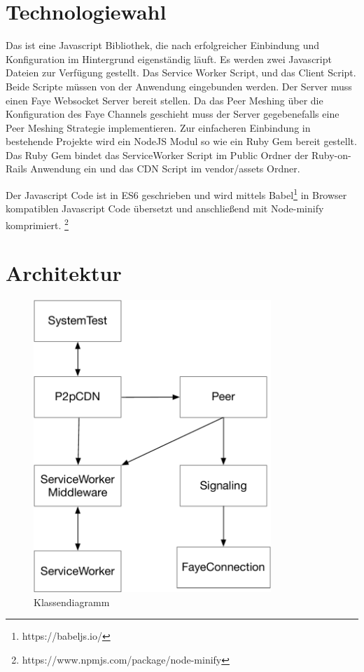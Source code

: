 %

\section{Technologiewahl}
Das \pTp \cdn ist eine Javascript Bibliothek, die nach erfolgreicher Einbindung und Konfiguration im Hintergrund eigenständig läuft. Es werden zwei Javascript Dateien zur Verfügung gestellt. Das Service Worker Script, und das \pTp \cdn Client Script. Beide Scripte müssen von der Anwendung eingebunden werden. Der Server muss einen Faye Websocket Server bereit stellen. Da das Peer Meshing über die Konfiguration des Faye Channels geschieht muss der Server gegebenefalls eine Peer Meshing Strategie implementieren. Zur einfacheren Einbindung in bestehende Projekte wird ein NodeJS Modul so wie ein Ruby Gem bereit gestellt. Das Ruby Gem bindet das ServiceWorker Script im Public Ordner der Ruby-on-Rails Anwendung ein und das \pTp CDN Script im vendor/assets Ordner.

Der Javascript Code ist in ES6 geschrieben und wird mittels Babel\footnote{https://babeljs.io/} in Browser kompatiblen Javascript Code übersetzt und anschließend mit Node-minify komprimiert. \footnote{https://www.npmjs.com/package/node-minify}

\section{Architektur}

\begin{figure}[!h]
	\centering
	\includegraphics[width=0.8\textwidth]{figures/Klassendiagramm}
	\caption[A Figure Short-Title]{Klassendiagramm}
	\label{fig:Klassendiagramm}
\end{figure}

